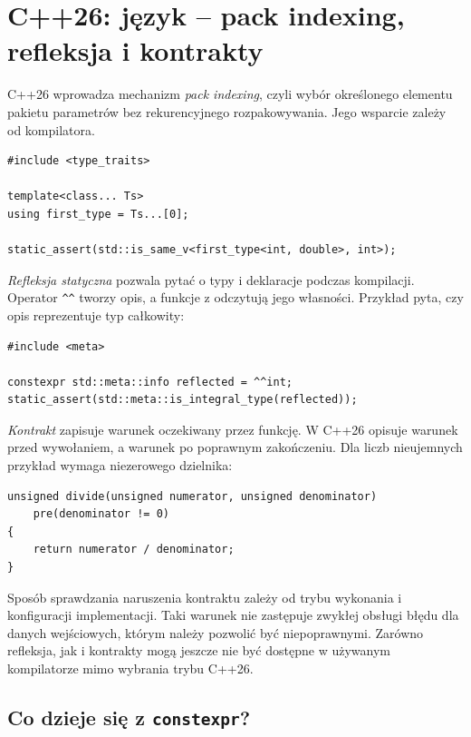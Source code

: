 \section{C++26: język -- pack indexing, refleksja i kontrakty}

C++26 wprowadza mechanizm \emph{pack indexing}, czyli wybór
określonego elementu pakietu parametrów bez rekurencyjnego
rozpakowywania. Jego wsparcie zależy od kompilatora.

\begin{lstlisting}[caption={Indeksowanie pakietu typow (C++26, tylko kompilator ze wsparciem).}]
#include <type_traits>

template<class... Ts>
using first_type = Ts...[0];

static_assert(std::is_same_v<first_type<int, double>, int>);
\end{lstlisting}

\emph{Refleksja statyczna} pozwala pytać o typy i deklaracje podczas
kompilacji. Operator \verb|^^| tworzy opis, a funkcje z 
odczytują jego własności. Przykład pyta, czy opis 
reprezentuje typ całkowity:

\begin{lstlisting}[caption={Proste zapytanie refleksyjne (C++26; wymaga wsparcia kompilatora i <meta>).}]
#include <meta>

constexpr std::meta::info reflected = ^^int;
static_assert(std::meta::is_integral_type(reflected));
\end{lstlisting}

\emph{Kontrakt} zapisuje warunek oczekiwany przez funkcję. W C++26
 opisuje warunek przed wywołaniem, a  warunek
po poprawnym zakończeniu. Dla liczb nieujemnych przykład wymaga
niezerowego dzielnika:

\begin{lstlisting}[caption={Warunek wstepny funkcji (C++26; wymaga wsparcia kontraktow).}]
unsigned divide(unsigned numerator, unsigned denominator)
    pre(denominator != 0)
{
    return numerator / denominator;
}
\end{lstlisting}

Sposób sprawdzania naruszenia kontraktu zależy od trybu wykonania
i konfiguracji implementacji. Taki warunek nie zastępuje zwykłej
obsługi błędu dla danych wejściowych, którym należy pozwolić być
niepoprawnymi. Zarówno refleksja, jak i kontrakty mogą jeszcze nie
być dostępne w używanym kompilatorze mimo wybrania trybu C++26.

\subsection{Co dzieje się z \texttt{constexpr}?}

